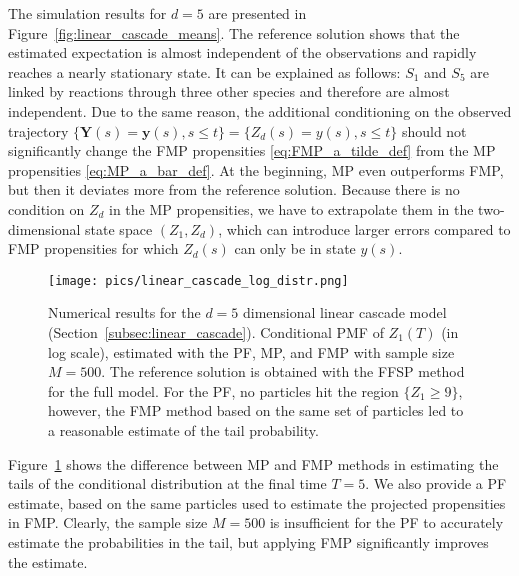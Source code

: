 The simulation results for $d=5$ are presented in Figure~\ref{fig:linear_cascade_means}. The reference solution shows that the estimated expectation is almost independent of the observations and rapidly reaches a nearly stationary state. It can be explained as follows: $S_1$ and $S_5$ are linked by reactions through three other species and therefore are almost independent. Due to the same reason, the additional conditioning on the observed trajectory $\{ \boldsymbol{Y}(s) = \boldsymbol{y}(s), s \leq t \} = \{ Z_d (s) = y(s), s \leq t \}$ should not significantly change the \ac{FMP} propensities \eqref{eq:FMP_a_tilde_def} from the \ac{MP} propensities \eqref{eq:MP_a_bar_def}. At the beginning, \ac{MP} even outperforms \ac{FMP}, but then it deviates more from the reference solution. Because there is no condition on $Z_d$ in the \ac{MP} propensities, we have to extrapolate them in the two-dimensional state space $(Z_1, Z_d)$, which can introduce larger errors compared to \ac{FMP} propensities for which $Z_d(s)$ can only be in state $y(s)$.

\begin{figure}
    \centering
    \texttt{[image: pics/linear\_cascade\_log\_distr.png]}
    \caption{
    Numerical results for the $d=5$ dimensional linear cascade model (Section~\ref{subsec:linear_cascade}). Conditional \ac{PMF} of $Z_1(T)$ (in log scale), estimated with the \ac{PF}, \ac{MP}, and \ac{FMP} with sample size $M = 500$. The reference solution is obtained with the \ac{FFSP} method for the full model. For the \ac{PF}, no particles hit the region $\{ Z_1 \geq 9 \}$, however, the \ac{FMP} method based on the same set of particles led to a reasonable estimate of the tail probability.
    }
    \label{fig:linear_cascade_log_distr}
\end{figure}

Figure~\ref{fig:linear_cascade_log_distr} shows the difference between \ac{MP} and \ac{FMP} methods in estimating the tails of the conditional distribution at the final time $T=5$. We also provide a \ac{PF} estimate, based on the same particles used to estimate the projected propensities in \ac{FMP}. Clearly, the sample size $M=500$ is insufficient for the \ac{PF} to accurately estimate the probabilities in the tail, but applying \ac{FMP} significantly improves the estimate.

